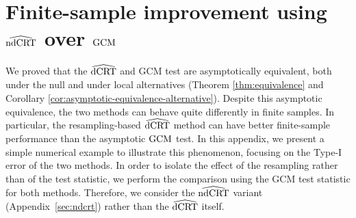 \documentclass[aos]{imsart}
\theoremstyle{definition}
\theoremstyle{remark}
\newcommand{\GCM}{\textnormal{GCM}}						%
\newcommand{\dCRThat}{\widehat{\textnormal{dCRT}}}		%
\newcommand{\ndCRThat}{\widehat{\textnormal{ndCRT}}}	%
\begin{document}
	\section{Finite-sample improvement using $\ndCRThat$ over $\GCM$} \label{sec:finite-sample-improvement}

	We proved that the $\dCRThat$ and GCM test are asymptotically equivalent, both under the null and under local alternatives (Theorem \ref{thm:equivalence} and Corollary \ref{cor:asymptotic-equivalence-alternative}). Despite this asymptotic equivalence, the two methods can behave quite differently in finite samples. In particular, the resampling-based $\dCRThat$ method can have better finite-sample performance than the asymptotic $\GCM$ test. In this appendix, we present a simple numerical example to illustrate this phenomenon, focusing on the Type-I error of the two methods. In order to isolate the effect of the resampling rather than of the test statistic, we perform the comparison using the GCM test statistic for both methods. Therefore, we consider the $\ndCRThat$ variant (Appendix~\ref{sec:ndcrt}) rather than the $\dCRThat$ itself.
\end{document}
